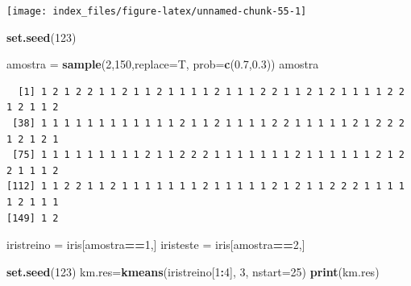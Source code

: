 \documentclass[12pt,brazil,oneside]{book}
\newenvironment{Shaded}{\begin{snugshade}}{\end{snugshade}}
\newcommand{\DataTypeTok}[1]{\textcolor[rgb]{0.13,0.29,0.53}{#1}}
\newcommand{\DecValTok}[1]{\textcolor[rgb]{0.00,0.00,0.81}{#1}}
\newcommand{\FloatTok}[1]{\textcolor[rgb]{0.00,0.00,0.81}{#1}}
\newcommand{\KeywordTok}[1]{\textcolor[rgb]{0.13,0.29,0.53}{\textbf{#1}}}
\newcommand{\NormalTok}[1]{#1}
\newcommand{\OperatorTok}[1]{\textcolor[rgb]{0.81,0.36,0.00}{\textbf{#1}}}
\newcommand{\StringTok}[1]{\textcolor[rgb]{0.31,0.60,0.02}{#1}}
\begin{document}
\begin{center}\texttt{[image: index\_files/figure-latex/unnamed-chunk-55-1]} \end{center}

\begin{Shaded}
\begin{Highlighting}[]
\KeywordTok{set.seed}\NormalTok{(}\DecValTok{123}\NormalTok{)}

\NormalTok{amostra =}\StringTok{ }\KeywordTok{sample}\NormalTok{(}\DecValTok{2}\NormalTok{,}\DecValTok{150}\NormalTok{,}\DataTypeTok{replace=}\NormalTok{T, }\DataTypeTok{prob=}\KeywordTok{c}\NormalTok{(}\FloatTok{0.7}\NormalTok{,}\FloatTok{0.3}\NormalTok{))}
\NormalTok{amostra}
\end{Highlighting}
\end{Shaded}

\begin{verbatim}
  [1] 1 2 1 2 2 1 1 2 1 1 2 1 1 1 1 2 1 1 1 2 2 1 1 2 1 2 1 1 1 1 2 2 1 2 1 1 2
 [38] 1 1 1 1 1 1 1 1 1 1 1 1 2 1 1 2 1 1 1 1 2 2 1 1 1 1 1 2 1 2 2 2 1 2 1 2 1
 [75] 1 1 1 1 1 1 1 1 1 2 1 1 2 2 2 1 1 1 1 1 1 1 2 1 1 1 1 1 1 2 1 2 2 1 1 1 2
[112] 1 1 2 2 1 1 2 1 1 1 1 1 1 1 2 1 1 1 1 1 2 1 2 1 1 2 2 2 1 1 1 1 1 2 1 1 1
[149] 1 2
\end{verbatim}

\begin{Shaded}
\begin{Highlighting}[]
\NormalTok{iristreino =}\StringTok{ }\NormalTok{iris[amostra}\OperatorTok{==}\DecValTok{1}\NormalTok{,]}
\NormalTok{iristeste =}\StringTok{ }\NormalTok{iris[amostra}\OperatorTok{==}\DecValTok{2}\NormalTok{,]}
\end{Highlighting}
\end{Shaded}

\begin{Shaded}
\begin{Highlighting}[]
\KeywordTok{set.seed}\NormalTok{(}\DecValTok{123}\NormalTok{)}
\NormalTok{km.res=}\KeywordTok{kmeans}\NormalTok{(iristreino[}\DecValTok{1}\OperatorTok{:}\DecValTok{4}\NormalTok{], }\DecValTok{3}\NormalTok{, }\DataTypeTok{nstart=}\DecValTok{25}\NormalTok{)}
\KeywordTok{print}\NormalTok{(km.res)}
\end{Highlighting}
\end{Shaded}
\end{document}
